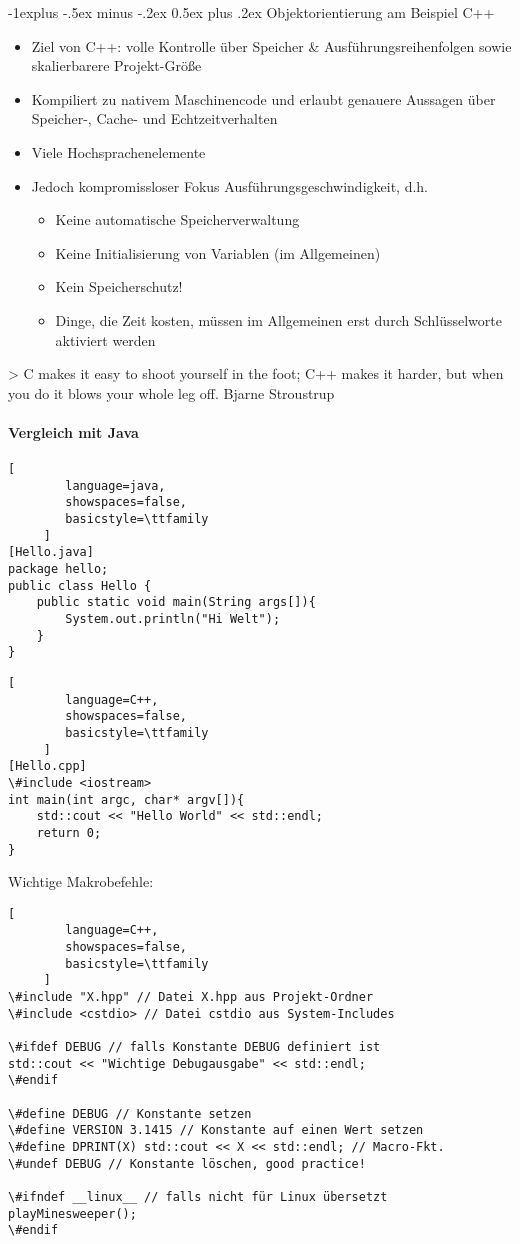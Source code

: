 \documentclass[10pt]{article}
\makeatletter
\renewcommand{\subsection}{\@startsection{subsection}{2}{0mm}%
                                {-1explus -.5ex minus -.2ex}%
                                {0.5ex plus .2ex}%
                                {\normalfont\normalsize\bfseries}}
\makeatother
\begin{document}
\subsection{Objektorientierung am Beispiel C++}
\begin{itemize}
  \item Ziel von C++: volle Kontrolle über Speicher \& Ausführungsreihenfolgen sowie skalierbarere Projekt-Größe
  \item Kompiliert zu nativem Maschinencode und erlaubt genauere Aussagen über Speicher-, Cache- und Echtzeitverhalten
  \item Viele Hochsprachenelemente
  \item Jedoch kompromissloser Fokus Ausführungsgeschwindigkeit, d.h.
        \begin{itemize}
          \item Keine automatische Speicherverwaltung
          \item Keine Initialisierung von Variablen (im Allgemeinen)
          \item Kein Speicherschutz!
          \item Dinge, die Zeit kosten, müssen im Allgemeinen erst durch Schlüsselworte aktiviert werden
        \end{itemize}
\end{itemize}

> C makes it easy to shoot yourself in the foot; C++ makes it harder,
but when you do it blows your whole leg off.
Bjarne Stroustrup

\paragraph{Vergleich mit Java}
\begin{lstlisting}[
        language=java,
        showspaces=false,
        basicstyle=\ttfamily
     ]
[Hello.java]
package hello;
public class Hello {
    public static void main(String args[]){
        System.out.println("Hi Welt");
    }
}
\end{lstlisting}
\begin{lstlisting}[
        language=C++,
        showspaces=false,
        basicstyle=\ttfamily
     ]
[Hello.cpp]
\#include <iostream>
int main(int argc, char* argv[]){
    std::cout << "Hello World" << std::endl;
    return 0;
}
\end{lstlisting}

Wichtige Makrobefehle:
\begin{lstlisting}[
        language=C++,
        showspaces=false,
        basicstyle=\ttfamily
     ]
\#include "X.hpp" // Datei X.hpp aus Projekt-Ordner
\#include <cstdio> // Datei cstdio aus System-Includes

\#ifdef DEBUG // falls Konstante DEBUG definiert ist
std::cout << "Wichtige Debugausgabe" << std::endl;
\#endif

\#define DEBUG // Konstante setzen
\#define VERSION 3.1415 // Konstante auf einen Wert setzen
\#define DPRINT(X) std::cout << X << std::endl; // Macro-Fkt.
\#undef DEBUG // Konstante löschen, good practice!

\#ifndef __linux__ // falls nicht für Linux übersetzt
playMinesweeper();
\#endif
\end{lstlisting}
\end{document}
